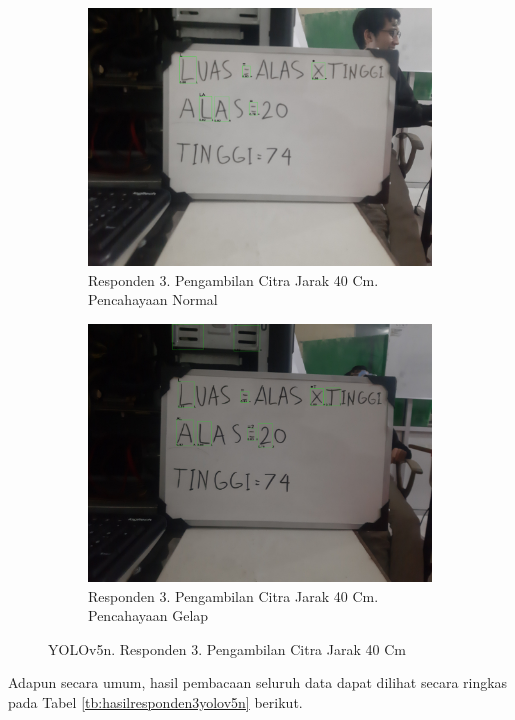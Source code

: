 \begin{figure}[H]
  \begin{subfigure}{.5\textwidth}
    \centering
    \captionsetup{width=.8\linewidth}
    \includegraphics[width=.8\linewidth]{gambar/yolov5n/responden3/hans40cm00-result.jpg}
    \caption{Responden 3. Pengambilan Citra Jarak 40 Cm. Pencahayaan Normal}
    \label{fig:nr3tcitra40cm}
  \end{subfigure}%
  \begin{subfigure}{.5\textwidth}
    \centering
    \captionsetup{width=.8\linewidth}
    \includegraphics[width=.8\linewidth]{gambar/yolov5n/responden3/hans40cm10-result.jpg}
    \caption{Responden 3. Pengambilan Citra Jarak 40 Cm. Pencahayaan Gelap}
    \label{fig:nr3gcitra40cm}
  \end{subfigure}
  \caption{YOLOv5n. Responden 3. Pengambilan Citra Jarak 40 Cm}
  \label{fig:nr3citra40cm}
\end{figure}

Adapun secara umum, hasil pembacaan seluruh data dapat dilihat secara ringkas pada Tabel \ref*{tb:hasilresponden3yolov5n} berikut.

